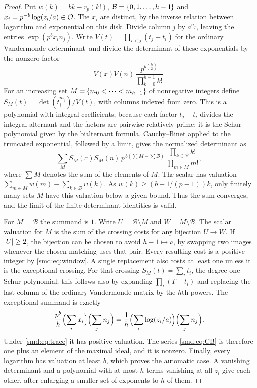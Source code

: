 \begin{proof}
Put $w(k)=bk-v_p(k!)$, $\mathcal B=\{0,1,\dots,h-1\}$ and
$x_i=p^{-b}\log(z_i/a)\in\mathcal{O}$. The $x_i$ are distinct, by the inverse relation between
logarithm and exponential on this disk. Divide column $j$ by $a^{n_j}$, leaving the entries
$\exp(p^bx_in_j)$. Write $V(t)=\prod_{i<j}(t_j-t_i)$ for the ordinary Vandermonde
determinant, and divide the determinant of these exponentials by the nonzero factor
\[
 V(x)V(n)\,\frac{p^{b\binom h2}}{\prod_{k=0}^{h-1}k!} .
\]
For an increasing set $M=\{m_0<\dots<m_{h-1}\}$ of nonnegative integers define
$S_M(t)=\det(t_i^{m_j})/V(t)$, with columns indexed from zero. This is a polynomial with
integral coefficients, because each factor $t_j-t_i$ divides the integral alternant and the
factors are pairwise relatively prime; it is the Schur polynomial given by the bialternant
formula. Cauchy--Binet applied to the truncated exponential, followed by a limit, gives the
normalized determinant as
\begin{equation}\label{smd:eq:CB}
 \sum_M S_M(x)S_M(n)\,p^{\,b(\sum M-\sum\mathcal B)}\,
 \frac{\prod_{k\in\mathcal B}k!}{\prod_{m\in M}m!},
\end{equation}
where $\sum M$ denotes the sum of the elements of $M$. The scalar has valuation
$\sum_{m\in M}w(m)-\sum_{k\in\mathcal B}w(k)$. As $w(k)\ge(b-1/(p-1))k$, only finitely many
sets $M$ have this valuation below a given bound. Thus the sum converges, and the limit of
the finite determinant identities is valid.

For $M=\mathcal B$ the summand is $1$. Write $U=\mathcal B\setminus M$ and
$W=M\setminus\mathcal B$. The scalar valuation for $M$ is the sum of the crossing costs for
any bijection $U\to W$. If $\lvert U\rvert\ge2$, the bijection can be chosen to avoid
$h-1\mapsto h$, by swapping two images whenever the chosen matching uses that pair. Every
resulting cost is a positive integer by \eqref{smd:eq:window}. A single replacement also
costs at least one unless it is the exceptional crossing. For that crossing
$S_M(t)=\sum_it_i$, the degree-one Schur polynomial; this follows also by expanding
$\prod_i(T-t_i)$ and replacing the last column of the ordinary Vandermonde matrix by the
$h$th powers. The exceptional summand is exactly
\[
 \frac{p^b}{h}\Bigl(\sum_ix_i\Bigr)\Bigl(\sum_jn_j\Bigr)
 =\frac1h\Bigl(\sum_i\log(z_i/a)\Bigr)\Bigl(\sum_jn_j\Bigr).
\]
Under \eqref{smd:eq:trace} it has positive valuation. The series \eqref{smd:eq:CB} is
therefore one plus an element of the maximal ideal, and it is nonzero. Finally, every
logarithm has valuation at least $b$, which proves the automatic case. A vanishing
determinant and a polynomial with at most $h$ terms vanishing at all $z_i$ give each other,
after enlarging a smaller set of exponents to $h$ of them.
\end{proof}

